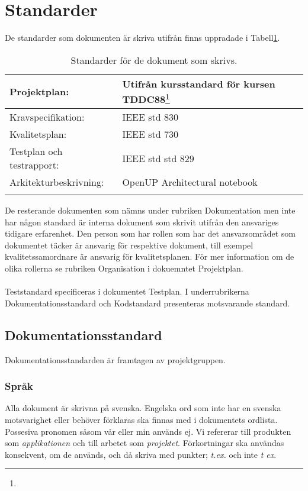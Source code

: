 \section{Standarder}
De standarder som dokumenten är skriva utifrån finns uppradade i Tabell\ref{tab:tabell2}.
\begin{table}
\begin{center}
\caption{Standarder för de dokument som skrivs.}
\begin{tabular}{| l | l |}
\hline
Projektplan: & Utifrån kursstandard för kursen TDDC88\footnote{}\\
\hline
Kravspecifikation: & IEEE std 830\\
\hline
Kvalitetsplan: & IEEE std 730\\
\hline
Testplan och testrapport: & IEEE std std 829\\
\hline
Arkitekturbeskrivning: & OpenUP Architectural notebook\\
\hline
\label{tab:tabell2}
\end{tabular}
\end{center}
\end{table}
De resterande dokumenten som nämns under rubriken Dokumentation men inte har någon standard är interna dokument som skrivit utifrån den ansvariges tidigare erfarenhet. Den person som har rollen som har det ansvarsområdet som dokumentet täcker är ansvarig för respektive dokument, till exempel kvalitetssamordnare är ansvarig för kvalitetsplanen. För mer information om de olika rollerna se rubriken Organisation i dokuemntet Projektplan.
\\ \\
Teststandard specificeras i dokumentet Testplan. I underrubrikerna Dokumentationsstandard och Kodstandard presenteras motsvarande standard.
\subsection{Dokumentationsstandard}
Dokumentationsstandarden är framtagen av projektgruppen.
\subsubsection{Språk}
Alla dokument är skrivna på svenska. Engelska ord som inte har en svenska motsvarighet eller behöver förklaras ska finnas med i dokumentets ordlista. Possesiva pronomen såsom vår eller min används ej. Vi refererar till produkten som  \textit{applikationen} och till arbetet som \textit{projektet}. Förkortningar ska användas konsekvent, om de används, och då skriva med punkter; \textit{t.ex.} och inte \textit{t ex}.
